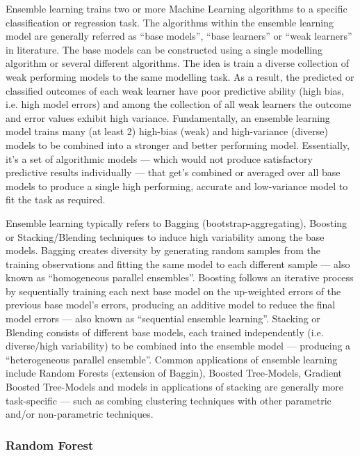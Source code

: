         Ensemble learning trains two or more Machine Learning algorithms to a specific classification or regression task. The algorithms within the ensemble learning model are generally referred as “base models”, “base learners” or “weak learners” in literature. The base models can be constructed using a single modelling algorithm or several different algorithms. The idea is train a diverse collection of weak performing models to the same modelling task. As a result, the predicted or classified outcomes of each weak learner have poor predictive ability (high bias, i.e. high model errors) and among the collection of all weak learners the outcome and error values exhibit high variance. Fundamentally, an ensemble learning model trains many (at least 2) high-bias (weak) and high-variance (diverse) models to be combined into a stronger and better performing model. Essentially, it’s a set of algorithmic models — which would not produce satisfactory predictive results individually — that get’s combined or averaged over all base models to produce a single high performing, accurate and low-variance model to fit the task as required.\par\vspace{1em}
        
        Ensemble learning typically refers to Bagging (bootstrap-aggregating), Boosting or Stacking/Blending techniques to induce high variability among the base models. Bagging creates diversity by generating random samples from the training observations and fitting the same model to each different sample — also known as “homogeneous parallel ensembles”. Boosting follows an iterative process by sequentially training each next base model on the up-weighted errors of the previous base model’s errors, producing an additive model to reduce the final model errors — also known as “sequential ensemble learning”. Stacking or Blending consists of different base models, each trained independently (i.e. diverse/high variability) to be combined into the ensemble model — producing a “heterogeneous parallel ensemble”. Common applications of ensemble learning include Random Forests (extension of Baggin), Boosted Tree-Models, Gradient Boosted Tree-Models and models in applications of stacking are generally more task-specific — such as combing clustering techniques with other parametric and/or non-parametric techniques. \par\vspace{1em}
        
        \subsubsection{Random Forest}
        

